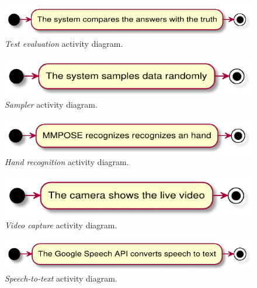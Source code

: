 \begin{figure}[h!t]
    \centering
    \includegraphics[scale=0.8]{assets/plantuml/pdf/eval.pdf}
    \caption{\emph{Test evaluation} activity diagram.}
    \label{fig:activity:eval}
\end{figure}

\begin{figure}[h!t]
    \centering
    \includegraphics[scale=0.8]{assets/plantuml/pdf/sampler.pdf}
    \caption{\emph{Sampler} activity diagram.}
    \label{fig:activity:sampler}
\end{figure}

\begin{figure}[h!t]
    \centering
    \includegraphics[scale=0.8]{assets/plantuml/pdf/hand.pdf}
    \caption{\emph{Hand recognition} activity diagram.}
    \label{fig:activity:hand}
\end{figure}

\begin{figure}[h!t]
    \centering
    \includegraphics[scale=0.8]{assets/plantuml/pdf/video.pdf}
    \caption{\emph{Video capture} activity diagram.}
    \label{fig:activity:video}
\end{figure}

\begin{figure}[h!t]
    \centering
    \includegraphics[scale=0.8]{assets/plantuml/pdf/speech.pdf}
    \caption{\emph{Speech-to-text} activity diagram.}
    \label{fig:activity:speech}
\end{figure}

